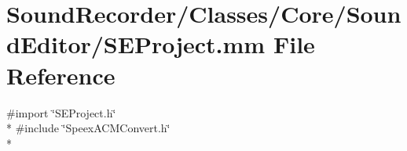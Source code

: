 \hypertarget{_s_e_project_8mm}{\section{Sound\-Recorder/\-Classes/\-Core/\-Sound\-Editor/\-S\-E\-Project.mm File Reference}
\label{_s_e_project_8mm}
}
{\ttfamily \#import \char`\"{}S\-E\-Project.\-h\char`\"{}}\\*
{\ttfamily \#include \char`\"{}Speex\-A\-C\-M\-Convert.\-h\char`\"{}}\\*
